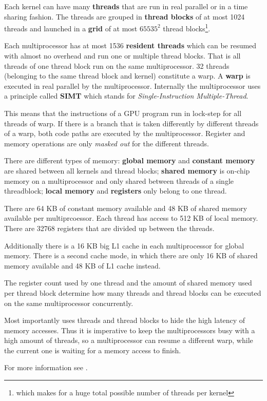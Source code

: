 Each kernel can have many \textbf{threads} that are run in real parallel or in a time sharing fashion. The threads are grouped in \textbf{thread blocks} of at most 1024 threads and launched in a \textbf{grid} of at most $65535^2$ thread blocks\footnote{which makes for a huge total possible number of threads per kernel}.

Each multiprocessor has at most 1536 \textbf{resident threads} which can be resumed with almost no overhead and run one or multiple thread blocks. That is all threads of one thread block run on the same multiprocessor. 32 threads (belonging to the same thread block and kernel) constitute a warp. A \textbf{warp} is executed in real parallel by the multiprocessor. Internally the multiprocessor uses a principle called \textbf{SIMT} which stands for \textit{Single-Instruction Multiple-Thread}.

This means that the instructions of a GPU program run in lock-step for all threads of warp. If there is a branch that is taken differently by different threads of a warp, both code paths are executed by the multiprocessor. Register and memory operations are only \textit{masked out} for the different threads. 

There are different types of memory: \textbf{global memory} and \textbf{constant memory} are shared between all kernels and thread blocks; \textbf{shared memory} is on-chip memory on a multiprocessor and only shared between threads of a single threadblock; \textbf{local memory} and \textbf{registers} only belong to one thread.

There are 64 KB of constant memory available and 48 KB of shared memory available per multiprcoessor. Each thread has access to 512 KB of local memory. There are 32768 registers that are divided up between the threads.

Additionally there is a 16 KB big L1 cache in each multiprocessor for global memory. There is a second cache mode, in which there are only 16 KB of shared memory available and 48 KB of L1 cache instead.

The register count used by one thread and the amount of shared memory used per thread block determine how many threads and thread blocks can be executed on the same multiprocessor concurrently.

Most importantly \cuda{} uses threads and thread blocks to hide the high latency of memory accesses. Thus it is imperative to keep the multiprocessors busy with a high amount of threads, so a multiprocessor can resume a different warp, while the current one is waiting for a memory access to finish.

For more information see .